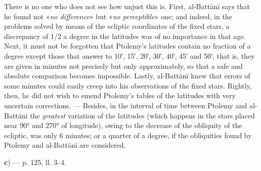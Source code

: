 \documentclass[11pt]{article}
\newcommand{\Pg}[1]{\marginpar{\footnotesize\color{gray}#1}}
\begin{document}
\par \Pg{I 295}There is no one who does not see how unjust this is. First, al-Battānī says that he found not «\emph{no difference}» but «\emph{no perceptible}» one; and indeed, in the problems solved by means of the ecliptic coordinates of the fixed stars, a discrepancy of 1/2 a degree in the latitudes was of no importance in that age. Next, it must not be forgotten that Ptolemy's latitudes contain no fraction of a degree except those that answer to 10′, 15′, 20′, 30′, 40′, 45′ and 50′; that is, they are given in minutes not precisely but only approximately, so that a safe and absolute comparison becomes impossible. Lastly, al-Battānī knew that errors of some minutes could easily creep into his observations of the fixed stars. Rightly, then, he did not wish to emend Ptolemy's tables of the latitudes with very uncertain corrections. — Besides, in the interval of time between Ptolemy and al-Battānī the \emph{greatest} variation of the latitudes (which happens in the stars placed near 90° and 270° of longitude), owing to the decrease of the obliquity of the ecliptic, was only 6 minutes; or a quarter of a degree, if the obliquities found by Ptolemy and al-Battānī are considered.\par
\par\begin{center}\textbf{c}) — p. 125, ll. 3–4.\end{center}
\end{document}
